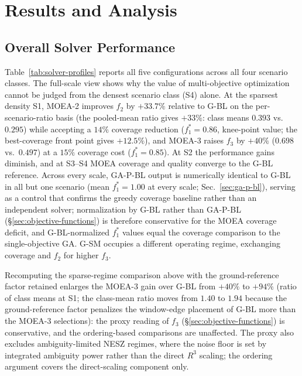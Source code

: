 \documentclass[preprint,12pt,authoryear]{elsarticle}
\begin{document}
\section{Results and Analysis}
\subsection{Overall Solver Performance}
\label{sec:overall-performance}
Table~\ref{tab:solver-profiles} reports all five configurations across all four
scenario classes. The full-scale view
shows why the value of multi-objective optimization cannot be judged from
the densest scenario class (S4) alone. At the sparsest density S1, MOEA-2 improves $f_2$ by $+33.7\%$ relative
to G-BL on the per-scenario-ratio basis (the pooled-mean ratio gives $+33\%$:
class means $0.393$ vs.\ $0.295$) while accepting a $14\%$ coverage reduction
($f_1^* = 0.86$, knee-point value; the best-coverage front point gives $+12.5\%$), and
MOEA-3 raises $f_3$ by $+40\%$ ($0.698$ vs.\ $0.497$) at a $15\%$ coverage cost
($f_1^* = 0.85$).
At S2 the performance gains diminish, and at S3--S4 MOEA coverage and quality
converge to the G-BL reference. Across every scale, GA-P-BL output is
numerically identical to G-BL in all but one scenario (mean $f_1^* = 1.00$
at every scale;
Sec.~\ref{sec:ga-p-bl}), serving as a control that confirms the greedy
coverage baseline rather than an independent solver; normalization by G-BL
rather than GA-P-BL (\S\ref{sec:objective-functions}) is therefore
conservative for the MOEA coverage deficit, and G-BL-normalized $f_1^*$
values equal the coverage comparison to the single-objective GA. G-SM occupies a different operating regime, exchanging
coverage and $f_2$ for higher $f_3$.

Recomputing the sparse-regime comparison above with the ground-reference
factor retained enlarges the MOEA-3 gain over G-BL from $+40\%$ to $+94\%$
(ratio of class means at S1; the class-mean ratio moves from $1.40$ to
$1.94$ because the ground-reference factor penalizes the window-edge
placement of G-BL more than the MOEA-3 selections): the proxy reading of
$f_3$ (\S\ref{sec:objective-functions}) is conservative, and the
ordering-based comparisons are unaffected. The proxy also excludes
ambiguity-limited NESZ regimes, where the noise floor is set by integrated
ambiguity power rather than the direct $R^3$ scaling; the ordering argument
covers the direct-scaling component only.
\end{document}
